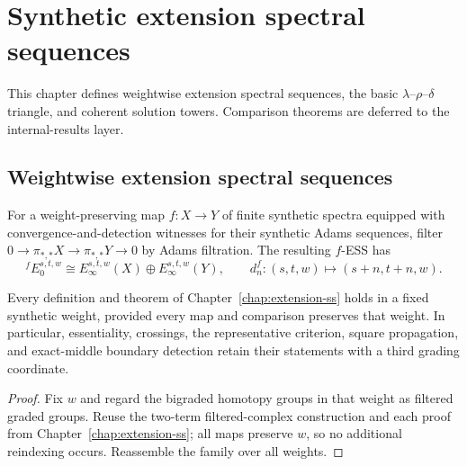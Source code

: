 \chapter{Synthetic extension spectral sequences}
\label{chap:synthetic-extension-ss}

This chapter defines weightwise extension spectral sequences, the basic $\lambda$--$\rho$--$\delta$ triangle, and coherent solution towers.  Comparison theorems are deferred to the internal-results layer.

\section{Weightwise extension spectral sequences}

\begin{definition}
  \label{def:synthetic-extension-ss}
  \notready
  For a weight-preserving map $f:X\to Y$ of finite synthetic spectra equipped
  with convergence-and-detection witnesses for their synthetic Adams
  sequences, filter
  $0\to\pi_{*,*}X\to\pi_{*,*}Y\to0$ by Adams filtration.  The resulting
  $f$-ESS has
  \[
    {}^fE_0^{s,t,w}\cong E_\infty^{s,t,w}(X)\oplus
    E_\infty^{s,t,w}(Y),
    \qquad d_n^f:(s,t,w)\mapsto(s+n,t+n,w).
  \]
\end{definition}

\begin{proposition}
  \label{prop:synthetic-ess-weightwise-transport}
  \notready
  Every definition and theorem of Chapter~\ref{chap:extension-ss} holds in a
  fixed synthetic weight, provided every map and comparison preserves that
  weight.  In particular, essentiality, crossings, the representative
  criterion, square propagation, and exact-middle boundary detection retain
  their statements with a third grading coordinate.
\end{proposition}

\begin{proof}
  Fix $w$ and regard the bigraded homotopy groups in that weight as filtered
  graded groups.  Reuse the two-term filtered-complex construction and each
  proof from Chapter~\ref{chap:extension-ss}; all maps preserve $w$, so no
  additional reindexing occurs.  Reassemble the family over all weights.
\end{proof}


